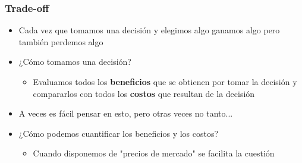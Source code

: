 \documentclass{beamer}
\begin{document}
\begin{frame}
\frametitle{Trade-off}
\begin{itemize}
    \item Cada vez que tomamos una decisión y elegimos algo ganamos algo pero también perdemos algo \vspace{2mm}
    \item ¿Cómo tomamos una decisión? 
    \begin{itemize}
        \item Evaluamos todos los \textbf{beneficios} que se obtienen por tomar la decisión y compararlos con todos los \textbf{costos} que resultan de la decisión
        \vspace{1mm}
    \end{itemize}
    \item A veces es fácil pensar en esto, pero otras veces no tanto...
    \item ¿Cómo podemos cuantificar los beneficios y los costos? 
    \begin{itemize}
    \item Cuando disponemos de "precios de mercado" se facilita la cuestión
    \end{itemize}
\end{itemize} 
\end{frame}
\end{document}
